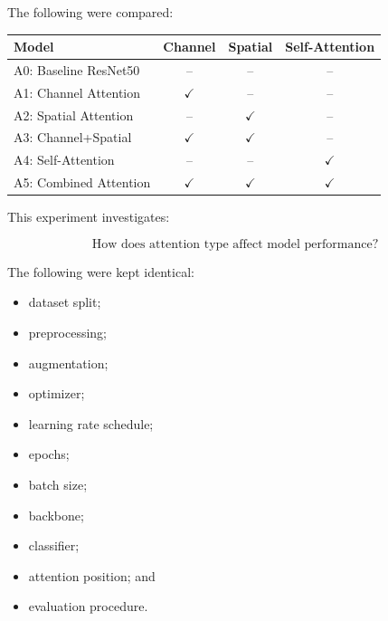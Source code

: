 \documentclass[10pt]{article}
\begin{document}
The following were compared:

\begin{center}

\begin{tabular}{|l|c|c|c|}
\hline

\textbf{Model}
&
\textbf{Channel}
&
\textbf{Spatial}
&
\textbf{Self-Attention}
\\
\hline

A0: Baseline ResNet50
&
--
&
--
&
--
\\
\hline

A1: Channel Attention
&
$\checkmark$
&
--
&
--
\\
\hline

A2: Spatial Attention
&
--
&
$\checkmark$
&
--
\\
\hline

A3: Channel+Spatial
&
$\checkmark$
&
$\checkmark$
&
--
\\
\hline

A4: Self-Attention
&
--
&
--
&
$\checkmark$
\\
\hline

A5: Combined Attention
&
$\checkmark$
&
$\checkmark$
&
$\checkmark$
\\
\hline

\end{tabular}

\end{center}

This experiment investigates:

\[
\boxed{
\text{How does attention type affect model performance?}
}
\]

The following were kept identical:

\begin{itemize}

\item dataset split;

\item preprocessing;

\item augmentation;

\item optimizer;

\item learning rate schedule;

\item epochs;

\item batch size;

\item backbone;

\item classifier;

\item attention position; and

\item evaluation procedure.

\end{itemize}
\end{document}
